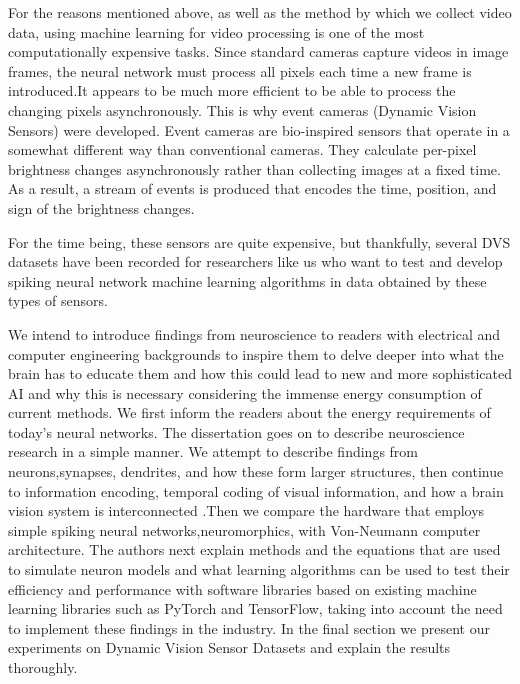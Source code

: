 \documentclass[12pt]{report}
\begin{document}
For the reasons mentioned above, as well as the method by which we collect video data, using machine learning for video processing is one of the most computationally expensive tasks. Since standard cameras capture videos in image frames, the neural network must process all pixels each time a new frame is introduced.It appears to be much more efficient to be able to process the changing pixels asynchronously. This is why event cameras (Dynamic Vision Sensors) were developed. Event cameras are bio-inspired sensors that operate in a somewhat different way than conventional cameras. They calculate per-pixel brightness changes asynchronously rather than collecting images at a fixed time. As a result, a stream of events is produced that encodes the time, position, and sign of the brightness changes.

For the time being, these sensors are quite expensive, but thankfully, several DVS datasets have been recorded for researchers like us who want to test and develop spiking neural network machine learning algorithms in data obtained by these types of sensors.

We intend to introduce findings from neuroscience to readers with electrical and computer engineering backgrounds to inspire them to delve deeper into what the brain has to educate them and how this could lead to new and more sophisticated AI and why this is necessary considering the immense energy consumption of current methods. We first inform the readers about the energy requirements of today's neural networks. The dissertation goes on to describe neuroscience research in a simple manner. We attempt to describe findings from neurons,synapses, dendrites, and how these form larger structures, then continue to information encoding, temporal coding of visual information, and how a brain vision system is interconnected .Then we compare the hardware that employs simple spiking neural networks,neuromorphics, with Von-Neumann computer architecture. The authors next explain methods and the equations that are used to simulate neuron models and what learning algorithms can be used to test their efficiency and performance with software libraries based on existing machine learning libraries such as PyTorch and TensorFlow, taking into account the need to implement these findings in the industry. In the final section we present our experiments on Dynamic Vision Sensor Datasets and explain the results thoroughly.
\end{document}
